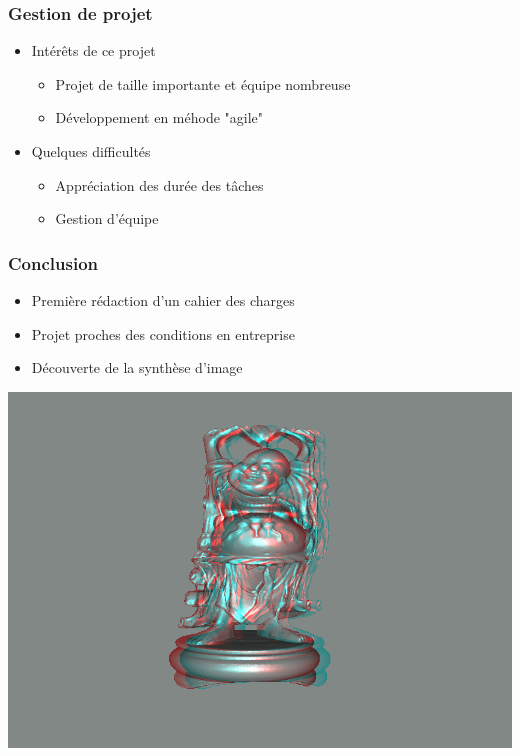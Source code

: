 \documentclass{beamer}
\begin{document}

\begin{frame}
\frametitle{Gestion de projet}
\begin{itemize}[label=$\bullet$]
\item Intérêts de ce projet
	\begin{itemize}[label=$\circ$]
	\item Projet de taille importante et équipe nombreuse
	\item Développement en méhode "agile"
	\end{itemize}
\item Quelques difficultés
	\begin{itemize}[label=$\circ$]
	\item Appréciation des durée des tâches
	\item Gestion d'équipe
	\end{itemize}
\end{itemize}
\end{frame}

\begin{frame}
\frametitle{Conclusion}
\begin{itemize}[label=$\bullet$]
\item Première rédaction d'un cahier des charges
\item Projet proches des conditions en entreprise
\item Découverte de la synthèse d'image
\end{itemize}
\end{frame}

%
	
\begin{frame} 
\includegraphics[scale=0.55]{happy_dubois.png}
\end{frame}

\end{document}
